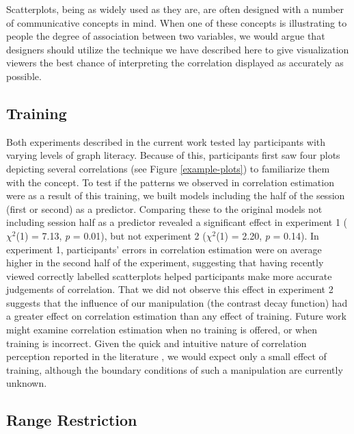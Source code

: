 \documentclass[preprint, 3p,
authoryear]{elsarticle} %
\begin{document}
Scatterplots, being as widely used as they are, are often designed with
a number of communicative concepts in mind. When one of these concepts
is illustrating to people the degree of association between two
variables, we would argue that designers should utilize the technique we
have described here to give visualization viewers the best chance of
interpreting the correlation displayed as accurately as possible.

\hypertarget{training}{%
\subsection{Training}\label{training}}

Both experiments described in the current work tested lay participants
with varying levels of graph literacy. Because of this, participants
first saw four plots depicting several correlations (see Figure
\ref{example-plots}) to familiarize them with the concept. To test if
the patterns we observed in correlation estimation were as a result of
this training, we built models including the half of the session (first
or second) as a predictor. Comparing these to the original models not
including session half as a predictor revealed a significant effect in
experiment 1 (\(\chi^2\)(1) = 7.13, \emph{p} = 0.01), but not experiment
2 (\(\chi^2\)(1) = 2.20, \emph{p} = 0.14). In experiment 1,
participants' errors in correlation estimation were on average higher in
the second half of the experiment, suggesting that having recently
viewed correctly labelled scatterplots helped participants make more
accurate judgements of correlation. That we did not observe this effect
in experiment 2 suggests that the influence of our manipulation (the
contrast decay function) had a greater effect on correlation estimation
than any effect of training. Future work might examine correlation
estimation when no training is offered, or when training is incorrect.
Given the quick and intuitive nature of correlation perception reported
in the literature \citep{rensink_2014}, we would expect only a small
effect of training, although the boundary conditions of such a
manipulation are currently unknown.

\hypertarget{range-restriction}{%
\subsection{Range Restriction}\label{range-restriction}}
\end{document}
